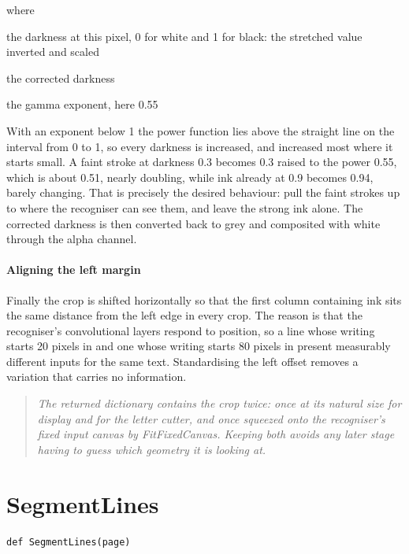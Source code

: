 \noindent where
\begin{description}[leftmargin=2.4em,style=nextline,font=\normalfont\ttfamily]\setlength\itemsep{1pt}
  \item[{$d[y,x]$}] \normalfont the darkness at this pixel, 0 for white and 1 for black: the stretched value inverted and scaled
  \item[{$d'[y,x]$}] \normalfont the corrected darkness
  \item[{$\gamma$}] \normalfont the gamma exponent, here 0.55
\end{description}
With an exponent below 1 the power function lies above the straight line on the interval from 0 to 1, so every darkness is increased, and increased most where it starts small. A faint stroke at darkness 0.3 becomes 0.3 raised to the power 0.55, which is about 0.51, nearly doubling, while ink already at 0.9 becomes 0.94, barely changing. That is precisely the desired behaviour: pull the faint strokes up to where the recogniser can see them, and leave the strong ink alone. The corrected darkness is then converted back to grey and composited with white through the alpha channel.


\paragraph{Aligning the left margin}
Finally the crop is shifted horizontally so that the first column containing ink sits the same distance from the left edge in every crop. The reason is that the recogniser's convolutional layers respond to position, so a line whose writing starts 20 pixels in and one whose writing starts 80 pixels in present measurably different inputs for the same text. Standardising the left offset removes a variation that carries no information.


\begin{quote}\small\itshape The returned dictionary contains the crop twice: once at its natural size for display and for the letter cutter, and once squeezed onto the recogniser's fixed input canvas by FitFixedCanvas. Keeping both avoids any later stage having to guess which geometry it is looking at.\end{quote}

\section{SegmentLines}
\begin{lstlisting}[style=sig]
def SegmentLines(page)
\end{lstlisting}

